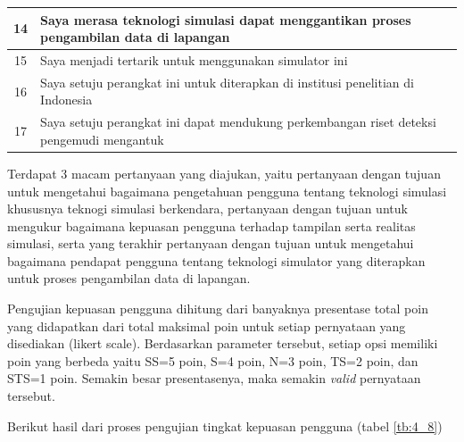 \begin{table}[]
\begin{tabular}{|c|p{9.5cm}|}
14          & Saya merasa teknologi simulasi dapat menggantikan proses pengambilan data   di lapangan                          \\ \hline
15          & Saya menjadi tertarik untuk menggunakan simulator ini                                                            \\ \hline
16          & Saya setuju perangkat ini untuk diterapkan di institusi penelitian di   Indonesia                                \\ \hline
17          & Saya setuju perangkat ini dapat mendukung perkembangan riset deteksi   pengemudi mengantuk                       \\ \hline
\end{tabular}
\end{table}

Terdapat 3 macam pertanyaan yang diajukan, yaitu pertanyaan dengan tujuan untuk mengetahui bagaimana pengetahuan pengguna tentang teknologi simulasi khususnya teknogi simulasi berkendara, pertanyaan dengan tujuan untuk mengukur bagaimana kepuasan pengguna terhadap tampilan serta realitas simulasi, serta yang terakhir pertanyaan dengan tujuan untuk mengetahui bagaimana pendapat pengguna tentang teknologi simulator yang diterapkan untuk proses pengambilan data di lapangan.
\par Pengujian kepuasan pengguna dihitung dari banyaknya presentase total poin yang didapatkan dari total maksimal poin untuk setiap pernyataan yang disediakan (likert scale). Berdasarkan parameter tersebut, setiap opsi memiliki poin yang berbeda yaitu SS=5 poin, S=4 poin, N=3 poin, TS=2 poin, dan STS=1 poin. Semakin besar presentasenya, maka semakin \textit{valid} pernyataan tersebut. 
\par Berikut hasil dari proses pengujian tingkat kepuasan pengguna (tabel \ref{tb:4_8})

